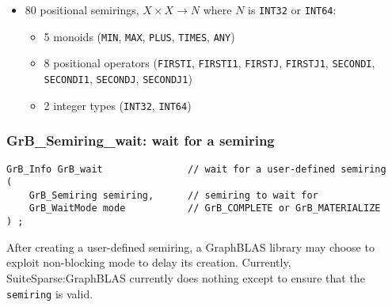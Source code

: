\documentclass[12pt]{article}
\begin{document}
{\begin{itemize}
    \vspace{-0.05in}
    \begin{itemize}
    \item 4 bitwise monoids (\verb'BOR', \verb'BAND', \verb'BXOR', \verb'BXNOR')
    \item 4 bitwise multiply operators (the same list)
    \item 4 unsigned integer types
    \end{itemize}

\item 80 positional semirings, $X \times X \rightarrow N$ where $N$ is
    \verb'INT32' or \verb'INT64':

    \vspace{-0.05in}
    \begin{itemize}
    \item 5 monoids (\verb'MIN', \verb'MAX', \verb'PLUS', \verb'TIMES', \verb'ANY')
    \item 8 positional operators
        (\verb'FIRSTI', \verb'FIRSTI1', \verb'FIRSTJ', \verb'FIRSTJ1',
        \verb'SECONDI', \verb'SECONDI1', \verb'SECONDJ', \verb'SECONDJ1')
    \item 2 integer types (\verb'INT32', \verb'INT64')
    \end{itemize}

\end{itemize}

\newpage
\subsubsection{{\sf GrB\_Semiring\_wait:} wait for a semiring}
\label{semiring_wait}

\begin{mdframed}[userdefinedwidth=6in]
{\footnotesize
\begin{verbatim}
GrB_Info GrB_wait               // wait for a user-defined semiring
(
    GrB_Semiring semiring,      // semiring to wait for
    GrB_WaitMode mode           // GrB_COMPLETE or GrB_MATERIALIZE
) ;
\end{verbatim}
}\end{mdframed}

After creating a user-defined semiring, a GraphBLAS library may choose to
exploit non-blocking mode to delay its creation.  Currently,
SuiteSparse:GraphBLAS currently does nothing except to ensure that the
\verb'semiring' is valid.

}
\end{document}
